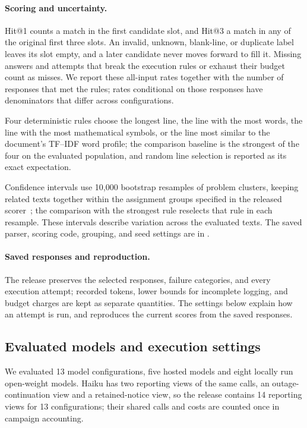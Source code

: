 \paragraph{Scoring and uncertainty.}
Hit@1 counts a match in the first candidate slot, and Hit@3 a match in any of the original first three slots. An invalid, unknown, blank-line, or duplicate label leaves its slot empty, and a later candidate never moves forward to fill it. Missing answers and attempts that break the execution rules or exhaust their budget count as misses. We report these all-input rates together with the number of responses that met the rules; rates conditional on those responses have denominators that differ across configurations.

Four deterministic rules choose the longest line, the line with the most words, the line with the most mathematical symbols, or the line most similar to the document's TF--IDF word profile; the comparison baseline is the strongest of the four on the evaluated population, and random line selection is reported as its exact expectation.

Confidence intervals use 10,000 bootstrap resamples of problem clusters, keeping related texts together within the assignment groups specified in the released scorer~\citep{efron1979bootstrap,field2007clustered}; the comparison with the strongest rule reselects that rule in each resample. These intervals describe variation across the evaluated texts. The saved parser, scoring code, grouping, and seed settings are in .

\paragraph{Saved responses and reproduction.}
The release preserves the selected responses, failure categories, and every execution attempt; recorded tokens, lower bounds for incomplete logging, and budget charges are kept as separate quantities. The settings below explain how an attempt is run, and  reproduces the current scores from the saved responses.




\subsection{Evaluated models and execution settings}
\label{app:ccl_models}

We evaluated 13 model configurations, five hosted models and eight locally run open-weight models. Haiku has two reporting views of the same calls, an outage-continuation view and a retained-notice view, so the release contains 14 reporting views for 13 configurations; their shared calls and costs are counted once in campaign accounting.

